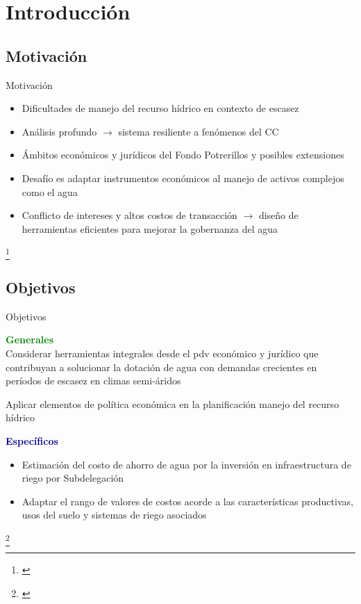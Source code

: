 \documentclass{beamer}\usepackage[]{graphicx}\usepackage[]{color}
\newcommand\blfootnote[1]{%
\begingroup
\renewcommand\thefootnote{}\footnote{#1}%
\addtocounter{footnote}{-1}%
\endgroup
}
\begin{document}

\section[Introducción]{Introducción}

\subsection{Motivación}

\begin{frame}{Motivación}
 \begin{itemize}
       \item Dificultades de manejo del recurso hídrico en contexto de escasez 
\pause \item Análisis profundo $\rightarrow$ sistema resiliente a fenómenos del CC
\pause \item Ámbitos económicos y jurídicos del Fondo Potrerillos y posibles extensiones \\
\pause \item Desafío es adaptar instrumentos económicos al manejo de activos complejos como el agua
\pause \item Conflicto de intereses y altos costos de transacción $\rightarrow$ diseño de herramientas eficientes para mejorar la gobernanza del agua
    \end{itemize}
    \blfootnote{\scriptsize \citep{Gomez2018,MAGyP2011b,Scheierling2016,Gruere2019}} 
    
\end{frame}

\subsection{Objetivos}
\begin{frame}{Objetivos}

\textcolor{green}{\textbf{Generales}} \\

Considerar herramientas integrales desde el pdv económico y jurídico que contribuyan a solucionar la dotación de agua con demandas crecientes en períodos de escasez en climas semi-áridos

Aplicar elementos de política económica en la planificación manejo del recurso hídrico 

\pause \vspace{3pt}
\textcolor{darkblue}{\textbf{Específicos}}
\begin{itemize}
\item Estimación del costo de ahorro de agua por la inversión en infraestructura de riego por Subdelegación

\item Adaptar el rango de valores de costos acorde a las características productivas, usos del suelo y sistemas de riego asociados
\end{itemize}
      \blfootnote{\scriptsize \citep{Pittock2016}}
\end{frame}
\end{document}
